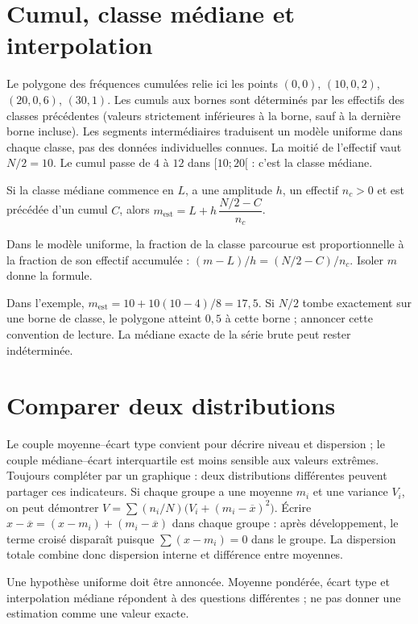 \documentclass[../cours_2de.tex]{subfiles}
\begin{document}
\section{Cumul, classe médiane et interpolation}
Le polygone des fréquences cumulées relie ici les points
$(0,0)$, $(10,0{,}2)$, $(20,0{,}6)$, $(30,1)$.
Les cumuls aux bornes sont déterminés par les effectifs des classes précédentes (valeurs strictement inférieures à la borne, sauf à la dernière borne incluse). Les segments intermédiaires traduisent un modèle uniforme dans chaque classe, pas des données individuelles connues.
La moitié de l'effectif vaut $N/2=10$. Le cumul passe de $4$ à $12$ dans $[10;20[$ : c'est la classe médiane.
\begin{propriete}
Si la classe médiane commence en $L$, a une amplitude $h$, un effectif $n_c>0$ et est précédée d'un cumul $C$, alors
$m_{\mathrm{est}}=L+h\,\dfrac{N/2-C}{n_c}$.
\end{propriete}
\begin{demonstration}
Dans le modèle uniforme, la fraction de la classe parcourue est proportionnelle à la fraction de son effectif accumulée :
$(m-L)/h=(N/2-C)/n_c$. Isoler $m$ donne la formule.
\end{demonstration}
Dans l'exemple, $m_{\mathrm{est}}=10+10(10-4)/8=17{,}5$.
Si $N/2$ tombe exactement sur une borne de classe, le polygone atteint $0{,}5$ à cette borne ; annoncer cette convention de lecture. La médiane exacte de la série brute peut rester indéterminée.
\section{Comparer deux distributions}
Le couple moyenne--écart type convient pour décrire niveau et dispersion ; le couple médiane--écart interquartile est moins sensible aux valeurs extrêmes.
Toujours compléter par un graphique : deux distributions différentes peuvent partager ces indicateurs.
\approfondissement Si chaque groupe a une moyenne $m_i$ et une variance $V_i$, on peut démontrer
$V=\sum (n_i/N)\bigl(V_i+(m_i-\overline x)^2\bigr)$.
Écrire $x-\overline x=(x-m_i)+(m_i-\overline x)$ dans chaque groupe : après développement, le terme croisé disparaît puisque $\sum(x-m_i)=0$ dans le groupe. La dispersion totale combine donc dispersion interne et différence entre moyennes.
\begin{retenir}
Une hypothèse uniforme doit être annoncée. Moyenne pondérée, écart type et interpolation médiane répondent à des questions différentes ; ne pas donner une estimation comme une valeur exacte.
\end{retenir}
\end{document}
